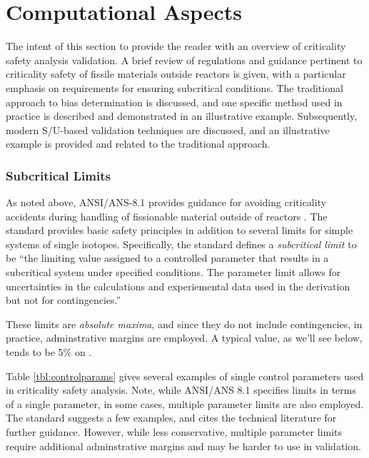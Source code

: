 
\section*{Computational Aspects}

The intent of this section to provide the reader with an 
overview of criticality safety analysis validation. A brief 
review of regulations and guidance pertinent to criticality safety of 
fissile materials outside reactors is given, with a particular emphasis on 
requirements for ensuring subcritical conditions. The traditional approach to 
bias determination is discussed, and one specific method used in practice
is described and demonstrated in an illustrative example. Subsequently, 
modern S/U-based validation techniques are discussed, and an 
illustrative example is provided and related to the traditional approach.


\subsubsection{Subcritical Limits}

As noted above, ANSI/ANS-8.1 provides guidance 
for avoiding criticality accidents during handling of fissionable material 
outside of reactors \cite{ans8}. The standard provides basic safety principles 
in addition to several limits for simple systems of single isotopes.  
Specifically, the standard defines a \textit{subcritical limit} to be ``the 
limiting value assigned to a controlled parameter that results in a subcritical 
system under specified conditions. The parameter limit allows for 
uncertainties in the calculations and experiemental data used in the derivation 
but not for contingencies.''

These limits are \textit{absolute maxima}, and since they do not include 
contingencies, in practice, adminstrative margins are employed.  A typical 
value, as we'll see below, tends to be 5\% on \keff.

Table \ref{tbl:controlparams} gives several examples of single control 
parameters used in criticality safety analysis.  Note, while ANSI/ANS 8.1 
specifies limits in terms of a single parameter, in some cases, multiple 
parameter limits are also employed.  The standard suggests a few examples, and
cites the technical literature for further guidance. However, while less 
conservative, multiple 
parameter limits require additional adminstrative margins and may be harder to 
use in validation.

